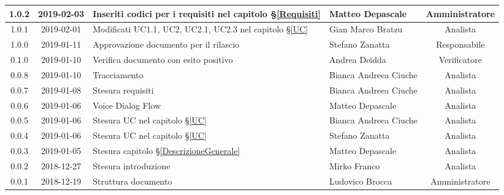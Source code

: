 \begin{center}
\begin{tabularx}{\textwidth}{|c|c|X|X|c|}
			\hline
			1.0.2 & 2019-02-03 & Inseriti codici per i requisiti nel capitolo \S\ref{Requisiti}& Matteo Depascale & Amministratore\\
			\hline
			1.0.1 & 2019-02-01 & Modificati UC1.1, UC2, UC2.1, UC2.3 nel capitolo \S\ref{UC}& Gian Marco Bratzu & Analista\\
			\hline
			1.0.0 & 2019-01-11 & Approvazione documento per il rilascio& Stefano Zanatta & Responsabile\\
			\hline
			0.1.0 & 2019-01-10 & Verifica documento con esito positivo& Andrea Deidda & Verificatore\\
			\hline
			0.0.8 & 2019-01-10 & Tracciamento& Bianca Andreea Ciuche& Analista\\
			\hline
			0.0.7 & 2019-01-08 & Stesura requisiti & Bianca Andreea Ciuche& Analista\\
			\hline
			0.0.6 & 2019-01-06 & Voice Dialog Flow & Matteo Depascale & Analista\\
			\hline
			0.0.5 & 2019-01-06 & Stesura UC nel capitolo \S\ref{UC}& Bianca Andreea Ciuche & Analista\\
			\hline
			0.0.4 & 2019-01-06 & Stesura UC nel capitolo \S\ref{UC}& Stefano Zanatta & Analista\\
			\hline
			0.0.3 & 2019-01-05 & Stesura capitolo \S\ref{DescrizioneGenerale}& Matteo Depascale & Analista\\
			\hline
			0.0.2 & 2018-12-27 & Stesura introduzione & Mirko Franco & Analista\\
			\hline
			0.0.1 & 2018-12-19 & Struttura documento & Ludovico Brocca & Amministratore\\
			\hline
		\end{tabularx}
	\end{center}
\newpage